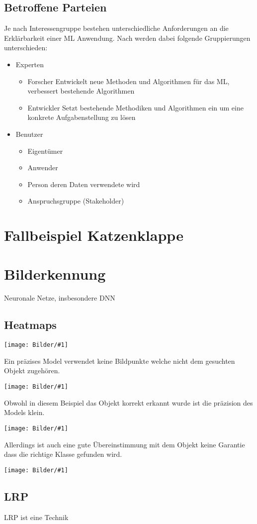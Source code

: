 \documentclass[
  12pt, %
  a4paper, %
  oneside, %
  openany, 
  numbers=noenddot, %
  BCOR=5mm, %
  parskip=half*, %
  thesis, %
]{bfhbook}
\newcommand{\imgText}[2]{
\begin{center}
    \begin{minipage}[t]{0.6\textwidth}
\texttt{[image: Bilder/\#1]}
	\end{minipage}\hfill
    \begin{minipage}[t]{0.4\textwidth}
  #2
    \end{minipage}
\end{center}
}
\begin{document}
\section{Betroffene Parteien}
Je nach Interessengruppe bestehen unterschiedliche Anforderungen an die Erklärbarkeit einer ML Anwendung. Nach \cite{Ras2018} werden dabei folgende Gruppierungen unterschieden:
\begin{itemize}
  \item Experten
  	\begin{itemize}
  		\item Forscher Entwickelt neue Methoden und Algorithmen für das ML, verbessert bestehende Algorithmen
  		\item Entwickler Setzt bestehende Methodiken und Algorithmen ein um eine konkrete Aufgabenstellung zu lösen
	\end{itemize}
  \item Benutzer
  	\begin{itemize}
  		\item Eigentümer
  		\item Anwender
  		\item Person deren Daten verwendete wird
  		\item Anspruchsgruppe (Stakeholder)
	\end{itemize}
\end{itemize}

\chapter{Fallbeispiel Katzenklappe}

\chapter{Bilderkennung}
Neuronale Netze, insbesondere \Gls{DNN}
\section{Heatmaps}
\imgText{dog-good-heatmap.png}{ 
Ein präzises Model verwendet keine Bildpunkte welche nicht dem gesuchten Objekt zugehören.
}

\imgText{dog-bad-heatmap.png}{ 
Obwohl in diesem Beispiel das Objekt korrekt erkannt wurde ist die präzision des Models klein.
}

\imgText{cat-good-heatmap.png}{ 
Allerdings ist auch eine gute Übereinstimmung mit dem Objekt keine Garantie dass die richtige Klasse gefunden wird.
}

\imgText{cat-bad-heatmap.png}{ 

}

\section{LRP}
\Gls{LRP} ist eine Technik 
\listoffigures
\begingroup
\let\clearpage\relax
\listoftables
\printglossary

\renewcommand\bibname{Literaturverzeichnis}

 


\endgroup
\end{document}
